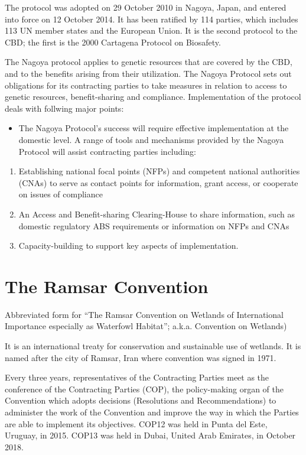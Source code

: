 \documentclass[]{book}
\providecommand{\tightlist}{%
  \setlength{\itemsep}{0pt}\setlength{\parskip}{0pt}}
\begin{document}
The protocol was adopted on 29 October 2010 in Nagoya, Japan, and entered into force on 12 October 2014. It has been ratified by 114 parties, which includes 113 UN member states and the European Union. It is the second protocol to the CBD; the first is the 2000 Cartagena Protocol on Biosafety.

The Nagoya protocol applies to genetic resources that are covered by the CBD, and to the benefits arising from their utilization. The Nagoya Protocol sets out obligations for its contracting parties to take measures in relation to access to genetic resources, benefit-sharing and compliance. Implementation of the protocol deals with follwing major points:

\begin{itemize}
\tightlist
\item
  The Nagoya Protocol's success will require effective implementation at the domestic level. A range of tools and mechanisms provided by the Nagoya Protocol will assist contracting parties including:
\end{itemize}

\begin{enumerate}
\def\labelenumi{\arabic{enumi}.}
\tightlist
\item
  Establishing national focal points (NFPs) and competent national authorities (CNAs) to serve as contact points for information, grant access, or cooperate on issues of compliance
\item
  An Access and Benefit-sharing Clearing-House to share information, such as domestic regulatory ABS requirements or information on NFPs and CNAs
\item
  Capacity-building to support key aspects of implementation.
\end{enumerate}

\hypertarget{the-ramsar-convention}{%
\section{The Ramsar Convention}\label{the-ramsar-convention}}

Abbreviated form for ``The Ramsar Convention on Wetlands of International Importance especially as Waterfowl Habitat''; a.k.a. Convention on Wetlands)

It is an international treaty for conservation and sustainable use of wetlands. It is named after the city of Ramsar, Iran where convention was signed in 1971.

Every three years, representatives of the Contracting Parties meet as the conference of the Contracting Parties (COP), the policy-making organ of the Convention which adopts decisions (Resolutions and Recommendations) to administer the work of the Convention and improve the way in which the Parties are able to implement its objectives. COP12 was held in Punta del Este, Uruguay, in 2015. COP13 was held in Dubai, United Arab Emirates, in October 2018.
\end{document}
